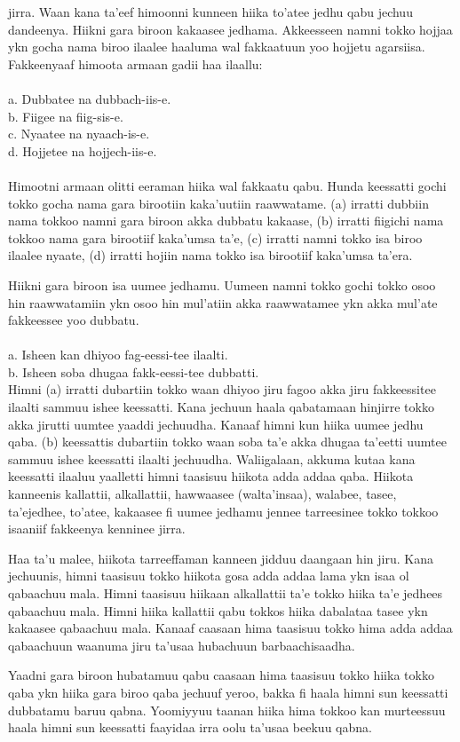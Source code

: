 \documentclass[11pt,b5paper]{book}
\begin{document}
jirra. Waan kana ta’eef himoonni kunneen hiika to’atee jedhu qabu jechuu dandeenya. Hiikni gara biroon kakaasee jedhama. Akkeesseen namni tokko hojjaa ykn gocha nama biroo ilaalee haaluma wal fakkaatuun yoo hojjetu agarsiisa. Fakkeenyaaf himoota armaan gadii haa ilaallu: \\
\\
a. Dubbatee na dubbach-iis-e.\\
b. Fiigee na fiig-sis-e.\\
c. Nyaatee na nyaach-is-e.\\
d. Hojjetee na hojjech-iis-e.\\
\\
Himootni armaan olitti eeraman hiika wal fakkaatu qabu. Hunda keessatti gochi tokko gocha nama gara birootiin kaka’uutiin raawwatame. (a) irratti dubbiin nama tokkoo namni gara biroon akka dubbatu kakaase, (b) irratti fiigichi nama tokkoo nama gara birootiif kaka’umsa ta’e, (c) irratti namni
tokko isa biroo ilaalee nyaate, (d) irratti hojiin nama tokko isa birootiif kaka’umsa ta’era. 

Hiikni gara biroon isa uumee jedhamu. Uumeen namni tokko gochi tokko osoo hin raawwatamiin ykn osoo hin mul’atiin akka raawwatamee ykn akka mul’ate fakkeessee yoo dubbatu.\\
\\
a. Isheen kan dhiyoo fag-eessi-tee ilaalti.\\
b. Isheen soba dhugaa fakk-eessi-tee dubbatti.\\

Himni (a) irratti dubartiin tokko waan dhiyoo jiru fagoo akka jiru fakkeessitee ilaalti sammuu ishee keessatti. Kana jechuun haala qabatamaan hinjirre tokko akka jirutti uumtee yaaddi jechuudha. Kanaaf himni kun hiika uumee jedhu qaba. (b) keessattis dubartiin tokko waan soba ta’e akka dhugaa ta’eetti
uumtee sammuu ishee keessatti ilaalti jechuudha. Waliigalaan, akkuma kutaa kana keessatti ilaaluu yaalletti himni taasisuu hiikota adda addaa qaba. Hiikota kanneenis kallattii, alkallattii,
hawwaasee (walta’insaa), walabee, tasee, ta’ejedhee, to’atee, kakaasee fi uumee jedhamu jennee tarreesinee tokko tokkoo isaaniif fakkeenya kenninee jirra.

Haa ta’u malee, hiikota tarreeffaman kanneen jidduu daangaan hin jiru. Kana jechuunis, himni taasisuu tokko hiikota gosa adda addaa lama ykn isaa ol qabaachuu mala. Himni taasisuu hiikaan alkallattii ta’e tokko hiika ta’e jedhees qabaachuu mala. Himni hiika kallattii qabu tokkos hiika dabalataa tasee ykn
kakaasee qabaachuu mala. Kanaaf caasaan hima taasisuu tokko hima adda addaa qabaachuun waanuma jiru ta’usaa hubachuun barbaachisaadha.

Yaadni gara biroon hubatamuu qabu caasaan hima taasisuu tokko hiika tokko qaba ykn hiika gara biroo qaba jechuuf yeroo, bakka fi haala himni sun keessatti dubbatamu baruu qabna. Yoomiyyuu taanan hiika hima tokkoo kan murteessuu haala himni sun keessatti faayidaa irra oolu ta’usaa beekuu qabna.



\newpage





\printindex 
\end{document}
